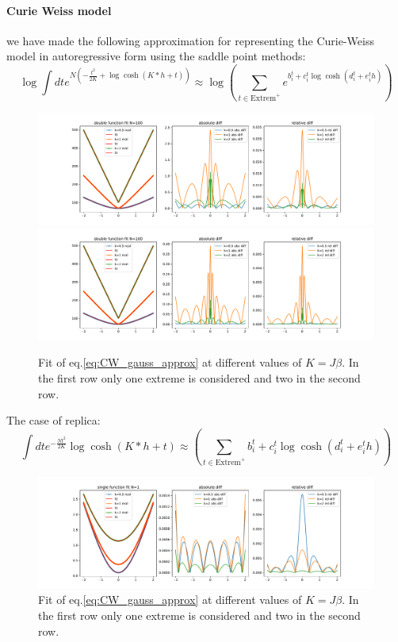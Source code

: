 \documentclass[aps,physrev,10pt,floatfix,longbibliography,nofootinbib,reprint]{revtex4-2}
\begin{document}
\paragraph{Curie Weiss model}
we have made the following approximation for representing the Curie-Weiss model in autoregressive form using the saddle point methods:
\[
\log \int dt e^{N(-\frac{t^2}{2K}+\log\cosh(K*h+t))} \approx \log\left(\sum_{t \in \text{Extrem}^+}  e^{b_i^t + c_i^t\log\cosh(d_i^t+e_i^t h)}\right)
\label{eq:CW_gauss_approx}
\]
\begin{figure}[h]
    \centering
    \includegraphics[width=1\textwidth]{img/CW_fit_N100.pdf}
    \includegraphics[width=1\textwidth]{img/CW_fit2_N100.pdf}
    \caption{Fit of eq.\ref{eq:CW_gauss_approx} at different values of $K=J\beta$. In the first row only one extreme is considered and two in the second row.}
    \label{fig:mesh1}
\end{figure}
The case of replica:
\[
 \int dt e^{-\frac{Nt^2}{2K}}\log\cosh(K*h+t) \approx \left(\sum_{t \in \text{Extrem}^+}  b_i^t + c_i^t\log\cosh(d_i^t+e_i^t h)\right)
\label{eq:CW_gauss_approx2}
\]

\begin{figure}[h]
    \centering
    \includegraphics[width=1\textwidth]{img/RFIM_fit.pdf}
    \caption{Fit of eq.\ref{eq:CW_gauss_approx} at different values of $K=J\beta$. In the first row only one extreme is considered and two in the second row.}
    \label{fig:gauss_approx}
\end{figure}
\end{document}
